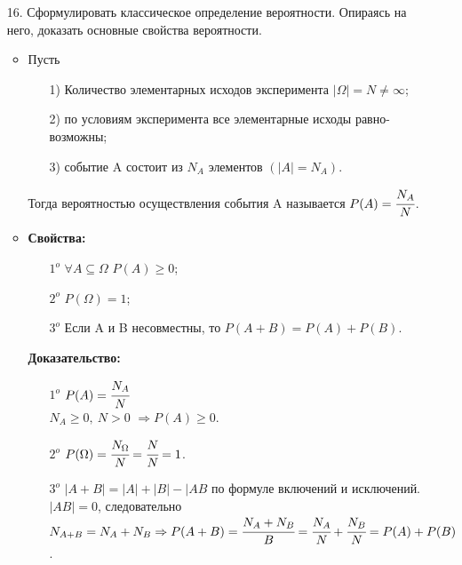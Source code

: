 \documentclass[a4paper]{article}
\begin{document}
\begin{enumerate}
\item[16.] Сформулировать классическое определение вероятности. Опираясь на него, доказать основные свойства вероятности. \\
\begin{itemize}
\item Пусть
	\begin{enumerate}
	\item[1)] Количество элементарных исходов эксперимента $|\Omega| = N \neq \infty$;
	\item[2)] по условиям эксперимента все элементарные исходы равно-возможны;
	\item[3)] событие A состоит из $N_A$ элементов $(|A| = N_A)$.
	\end{enumerate}
Тогда вероятностью осуществления события A называется $P(A) = \cfrac{N_A}{N}$.
\item \textbf{Свойства:} 
	\begin{enumerate}
	\item[$1^o$] $\forall A \subseteq \Omega$  $P(A) \geqslant 0$; 
	\item[$2^o$] $P(\Omega) = 1$; \\
	\item[$3^o$] Если A и B несовместны, то $P(A+B) = P(A) + P(B)$.
	\end{enumerate}
\textbf{Доказательство:} \\
	\begin{enumerate}
	\item[$1^o$] $P(A) = \cfrac{N_A}{N}$ \\
	$N_A \geqslant 0, \ N > 0$ $\Rightarrow P(A) \geqslant 0$. 
	\item[$2^o$] $P(\Omega) = \cfrac{N_{\Omega}}{N} = \cfrac{N}{N} = 1$.
	\item[$3^o$] $|A+B| = |A| + |B| - |AB$ по формуле включений и исключений. $|AB| = 0$, следовательно $N_{A+B} = N_A + N_B \Rightarrow P(A+B) = \cfrac{N_A + N_B}{B} = \cfrac{N_A}{N} + \cfrac{N_B}{N} = P(A) + P(B)$.
	\end{enumerate}
\end{itemize}




\end{enumerate}
\end{document}
